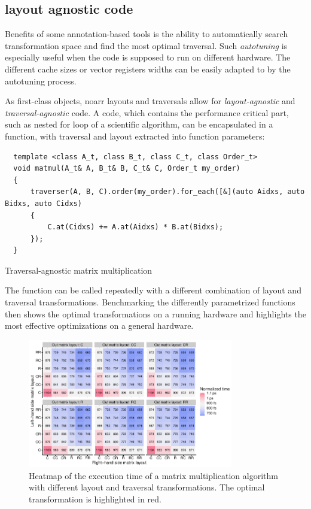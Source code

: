 \subsection{layout agnostic code}

Benefits of some annotation-based tools is the ability to automatically search transformation space and find the most optimal traversal. Such \emph{autotuning} is especially useful when the code is supposed to run on different hardware. The different cache sizes or vector registers widths can be easily adapted to by the autotuning process.

As first-class objects, noarr layouts and traversals allow for \emph{layout-agnostic} and \emph{traversal-agnostic} code. A code, which contains the performance critical part, such as nested for loop of a scientific algorithm, can be encapsulated in a function, with traversal and layout extracted into function parameters:
\begin{listing}
  \begin{verbatim}
  template <class A_t, class B_t, class C_t, class Order_t>
  void matmul(A_t& A, B_t& B, C_t& C, Order_t my_order) 
  {
      traverser(A, B, C).order(my_order).for_each([&](auto Aidxs, auto Bidxs, auto Cidxs)
      {
          C.at(Cidxs) += A.at(Aidxs) * B.at(Bidxs);
      });
  }
  \end{verbatim}
  \caption{Traversal-agnostic matrix multiplication}
  \label{lst:agn}
\end{listing}

The function can be called repeatedly with a different combination of layout and traversal transformations. Benchmarking the differently parametrized functions then shows the optimal transformations on a running hardware and highlights the most effective optimizations on a general hardware.


\begin{figure}
  \centering
  \includegraphics[width=0.8\textwidth]{img/heatmap_all}
  \caption{Heatmap of the execution time of a matrix multiplication algorithm with different layout and traversal transformations. The optimal transformation is highlighted in red.}
  \label{fig:heatmap_all}
\end{figure}

